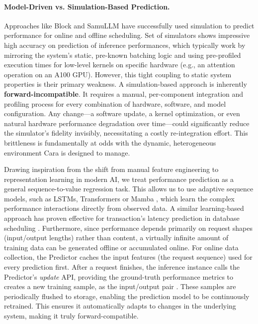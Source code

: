 \documentclass[letterpaper, anonymous, twocolumn, 10pt]{article}
\begin{document}
\paragraph{Model-Driven vs. Simulation-Based Prediction.}
Approaches like Block\cite{da2025blockbalancingloadllm} and SamuLLM\cite{SamuLLM} have successfully used simulation to predict performance for online and offline scheduling. Set of simulators \cite{kumar2025simulatingllmtraining, tan2025frontiersimulatingnext, kim2024llmservingsimhwswcosimulation, Agrawal2024VidurAL} shows impressive high accuracy on prediction of inference performances, which typically work by mirroring the system's static, pre-known batching logic and using pre-profiled execution times for low-level kernels on specific hardware (e.g., an attention operation on an A100 GPU). However, this tight coupling to static system properties is their primary weakness. A simulation-based approach is inherently \textbf{forward-incompatible}. It requires a manual, per-component integration and profiling process for every combination of hardware, software, and model configuration. Any change—a software update, a kernel optimization, or even natural hardware performance degradation over time—could significantly reduce the simulator's fidelity invisibly, necessitating a costly re-integration effort. This brittleness is fundamentally at odds with the dynamic, heterogeneous environment Cara is designed to manage.

Drawing inspiration from the shift from manual feature engineering to representation learning in modern AI, we treat performance prediction as a general sequence-to-value regression task. This allows us to use adaptive sequence models, such as LSTMs\cite{lstm}, Transformers\cite{attentionIsAllUrneed} or Mamba \cite{mamaba}, which learn the complex performance interactions directly from observed data. A similar learning-based approach has proven effective for transaction's latency prediction in database scheduling \cite{wu2025improvingdbmsschedulingdecisions}. Furthermore, since performance depends primarily on request shapes (input/output lengths) rather than content, a virtually infinite amount of training data can be generated offline or accumulated online. For online data collection, the Predictor caches the input features (the request sequence) used for every prediction first. After a request finishes, the inference instance calls the Predictor's \textit{update} API, providing the ground-truth performance metrics to creates a new training sample, as the input/output pair . These samples are periodically flushed to storage, enabling the prediction model to be continuously retrained. This ensures it automatically adapts to changes in the underlying system, making it truly forward-compatible.
\end{document}
